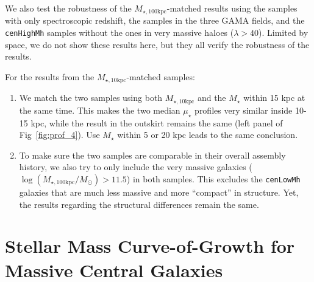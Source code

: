 \documentclass[a4paper,fleqn,usenatbib]{mnras}
\def\rbcg{\texttt{cenHighMh}}
\def\nbcg{\texttt{cenLowMh}}
\def\mstar{{$M_{\star}$}}
\def\minn{{$M_{\star,10\mathrm{kpc}}$}}
\def\mtot{{$M_{\star,100\mathrm{kpc}}$}}
\def\logmtot{{$\log (M_{\star,100\mathrm{kpc}}/M_{\odot})$}}
\def\mden{{$\mu_{\star}$}}
\begin{document}
    We also test the robustness of the \mtot{}-matched results using the samples with 
    only spectroscopic redshift, the samples in the three GAMA fields, and the \rbcg{} 
    samples without the ones in very massive haloes ($\lambda > 40$).  
    Limited by space, we do not show these results here, but they all verify the 
    robustness of the results. 
    
    For the results from the \minn{}-matched samples: 
    
    \begin{enumerate}
    
        \item
            We match the two samples using both \minn{} and the \mstar{} within 15 kpc 
            at the same time.  
            This makes the two median \mden{} profiles very similar inside 10-15 
            kpc, while the result in the outskirt remains the same (left panel of 
            Fig~\ref{fig:prof_4}).
            Use \mstar{} within 5 or 20 kpc leads to the same conclusion. 
          
        \item 
            To make sure the two samples are comparable in their overall assembly history,
            we also try to only include the very massive galaxies (\logmtot{}$>11.5$)
            in both samples. 
            This excludes the \nbcg{} galaxies that are much less massive and 
            more ``compact'' in structure. 
            Yet, the results regarding the structural differences remain the same. 
          
    \end{enumerate}

\section{Stellar Mass Curve-of-Growth for Massive Central Galaxies} 
	\label{app:cog}
\end{document}

